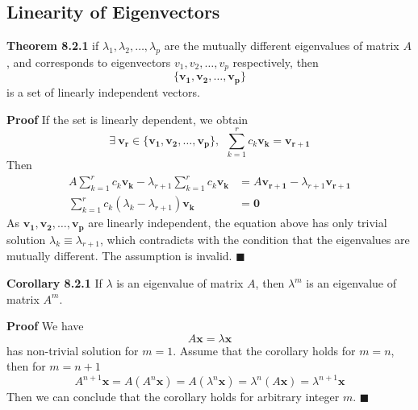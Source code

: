 \documentclass[11pt]{article}
\begin{document}
\subsection{Linearity of Eigenvectors}
\noindent \textbf{Theorem 8.2.1}
if $\lambda_1, \lambda_2, \dots, \lambda_p$ are the mutually different eigenvalues of matrix $A$, and corresponds to eigenvectors $v_1, v_2, \dots, v_p$ respectively, then
\begin{equation}
    \{\bm{v_1}, \bm{v_2}, \dots, \bm{v_p}\}
\end{equation}
is a set of linearly independent vectors. \par \noindent
\textbf{Proof} If the set is linearly dependent, we obtain
\begin{equation}
    \exists~\bm{v_r} \in \{\bm{v_1}, \bm{v_2}, \dots, \bm{v_p}\},~~\sum_{k=1}^{r}c_{k}\bm{v_{k}} = \bm{v_{r+1}}
\end{equation}
Then
\begin{equation}
\begin{aligned}
    A\sum_{k=1}^{r}c_{k}\bm{v_k} - \lambda_{r+1}\sum_{k=1}^{r}c_{k}\bm{v_{k}} &= A\bm{v_{r+1}} - \lambda_{r+1}\bm{v_{r+1}} \\
    \sum_{k=1}^{r}c_{k}(\lambda_{k}-\lambda_{r+1})\bm{v_{k}} &= \bm{0}
\end{aligned}
\end{equation}
As $\bm{v_1},\bm{v_2},\dots,\bm{v_{p}}$ are linearly independent, the equation above has only trivial solution $\lambda_{k} \equiv \lambda_{r+1}$, which contradicts with the condition that the eigenvalues are mutually different. The assumption is invalid. \hfill $\blacksquare$ \par \noindent
\textbf{Corollary 8.2.1} If $\lambda$ is an eigenvalue of matrix $A$, then $\lambda^m$ is an eigenvalue of matrix $A^m$. 
\par  \noindent \textbf{Proof} We have
\begin{equation}
    A\bm{x} = \lambda \bm{x}
\end{equation}
has non-trivial solution for $m=1$. Assume that the corollary holds for $m = n$, then for $m = n+1$
\begin{equation}
    A^{n+1}\bm{x} = A(A^{n}\bm{x}) = A(\lambda^n \bm{x}) = \lambda^n (A\bm{x}) = \lambda^{n+1}\bm{x}
\end{equation}
Then we can conclude that the corollary holds for arbitrary integer $m$. \hfill $\blacksquare$
\end{document}
